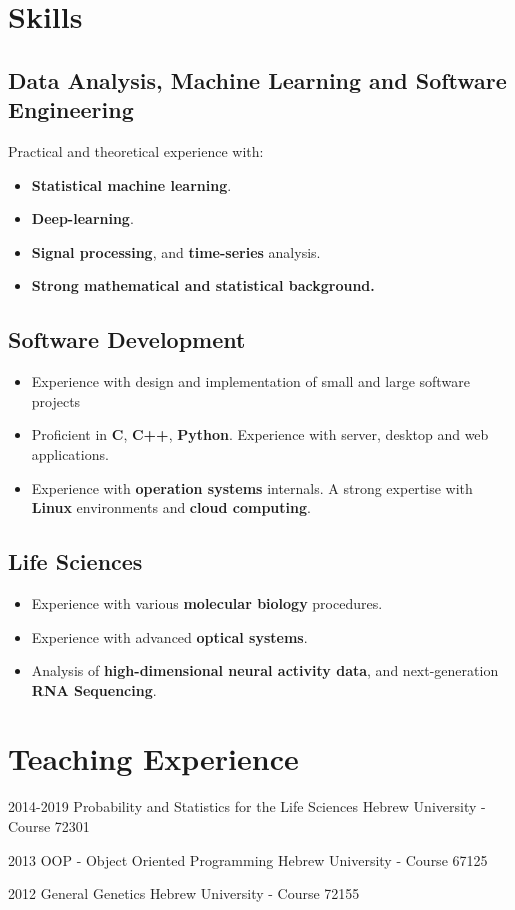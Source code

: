 \documentclass{tccv_Eyal}
\begin{document}
\section{Skills}
\subsection{Data Analysis, Machine Learning and Software Engineering}
Practical and theoretical experience with:
\begin{itemize}
    \item
    \textbf{Statistical machine learning}.
    \item
    \textbf{Deep-learning}.
    \item
    \textbf{Signal processing}, and \textbf{time-series} analysis.
    \item
    \textbf{Strong mathematical and statistical background.}

\end{itemize}
\subsection{Software Development}
\begin{itemize}
    \item
    Experience with design and implementation of small and large software projects
    \item
    Proficient in \textbf{C}, \textbf{C++}, \textbf{Python}. Experience with server, desktop and web applications.
    \item
    Experience with \textbf{operation systems} internals. A strong expertise with \textbf{Linux} environments and \textbf{cloud computing}.
\end{itemize}
\subsection{Life Sciences}
\begin{itemize}
    \item
    Experience with various \textbf{molecular biology} procedures.
    \item
    Experience with advanced \textbf{optical systems}.
    \item
    Analysis of \textbf{high-dimensional neural activity data}, and next-generation \textbf{RNA Sequencing}.
\end{itemize}

\section{Teaching Experience}
\begin{yearlistTeach}
\item{2014-2019}
     {Probability and Statistics for the Life Sciences}
     {Hebrew University - Course 72301}
\item{2013}
     {OOP - Object Oriented Programming}
     {Hebrew University - Course 67125}
\item{2012}
     {General Genetics}
     {Hebrew University - Course 72155}
\end{yearlistTeach}
\end{document}
